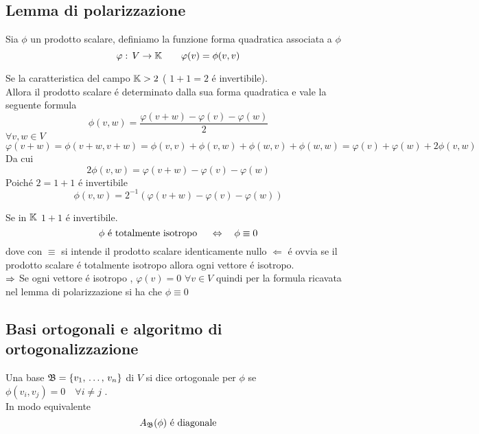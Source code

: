 \subsection{Lemma di polarizzazione}
\begin{defn}\bianco
Sia $\phi$ un prodotto scalare, definiamo la funzione forma quadratica associata a $\phi$
$$ \varphi: \, V \to \mathbb{K}  \qquad \varphi(v) =\phi(v,v) $$
\end{defn}
\begin{lem}[di polarizzazione]\bianco
Se la caratteristica del campo $\mathbb{K}>2 $ ( $1+1=2$ \'e invertibile).\\
Allora il prodotto scalare \'e determinato dalla sua forma quadratica e vale la seguente formula
$$  \phi(v,w) = \frac{ \varphi(v+w) - \varphi(v) - \varphi(w) }{2}$$
\proof
$\forall v,w \in V $
$$ \varphi(v+w) =  \phi(v+w,v+w) = \phi(v,v)+ \phi(v,w) + \phi(w,v) + \phi(w,w) = \varphi(v) + \varphi(w) + 2\phi(v,w) $$ 
Da cui
$$ 2 \phi(v,w) = \varphi(v+w) - \varphi(v) - \varphi(w) $$ 
Poich\'e $2=1+1$ \'e invertibile
$$ \phi(v,w) = 2^{-1} (  \varphi(v+w) - \varphi(v) - \varphi(w) )$$
\endproof
\end{lem}
\begin{cor}\label{cor15.17} Se in $\mathbb{K}$  $1+1$ \'e invertibile.\\
$$ \phi \text{ \'e totalmente isotropo } \quad \Leftrightarrow \quad \phi \equiv 0 $$
dove con $\equiv$ si intende il prodotto scalare identicamente nullo 
\proof
$\Leftarrow$ \'e ovvia se il prodotto scalare \'e totalmente isotropo allora ogni vettore \'e isotropo.\\
$\Rightarrow$ Se ogni vettore \'e isotropo , $\varphi(v)=0 $ $\forall v \in V $ quindi per la formula ricavata nel lemma di polarizzazione si ha che $\phi \equiv 0 $\endproof
\end{cor}
\newpage
\subsection{Basi ortogonali e algoritmo di ortogonalizzazione}
\begin{defn}\bianco
Una base $\mathfrak{B}=\{ v_1, \, \dots , \, v_n \} $  di $V$ si dice ortogonale per $\phi$ 
se 
$  \phi(v_i,v_j) =0  \quad \forall i \neq j $ .\\
In modo equivalente 
$$ A_{\mathfrak{B}} (\phi) \text{ \'e diagonale} $$
 \end{defn}
\spazio

